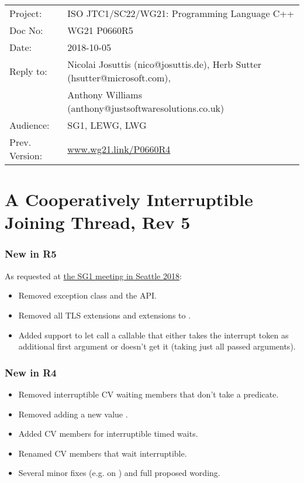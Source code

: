 
{\small
\begin{tabular}{@{}ll}
Project:  	& ISO JTC1/SC22/WG21: Programming Language C++ \\
Doc No: 	& WG21 P0660R5 \\
Date: 		& 2018-10-05 \\
Reply to: 	& Nicolai Josuttis (nico@josuttis.de), Herb Sutter (hsutter@microsoft.com), \\
                &         Anthony Williams (anthony@justsoftwaresolutions.co.uk) \\
Audience: 	& SG1, LEWG, LWG \\
Prev. Version:	& \url{www.wg21.link/P0660R4} \\
\end{tabular}
}

\section*{{\huge{}A Cooperatively Interruptible Joining Thread, Rev 5}}

\subsubsection*{New in R5}
As requested at
\href{http://wiki.edg.com/bin/view/ExecSeattle2018/MinutesDay2}{the SG1 meeting in Seattle 2018}:
\begin{itemize}
 \item Removed exception class  and the  API.
 \item Removed all TLS extensions and extensions to .
 \item Added support to let  call a callable that
        either takes the interrupt token as additional first argument
        or doesn't get it (taking just all passed arguments).
\end{itemize}

\subsubsection*{New in R4}
\begin{itemize}
 \item Removed interruptible CV waiting members that don't take a predicate.
 \item Removed adding a new  value .
 \item Added CV members for interruptible timed waits.
 \item Renamed CV members that wait interruptible.
 \item Several minor fixes (e.g. on ) and full proposed wording.
\end{itemize}

